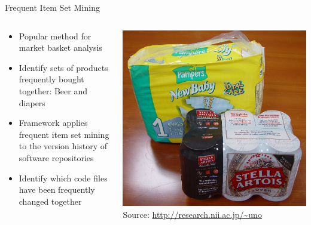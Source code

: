 \begin{frame}{Frequent Item Set Mining}
  \begin{columns}[c]
    \begin{column}{0.5\textwidth}
      \begin{itemize}
      \item Popular method for market basket analysis
      \item Identify sets of products frequently bought together: Beer
        and diapers
      \item Framework applies frequent item set mining to the version
        history of software repositories
      \item Identify which code files have been frequently changed
        together
      \end{itemize}
    \end{column}
    \begin{column}{0.5\textwidth}
      \begin{center}
        \includegraphics[width=\textwidth]{figures/frequent-item-set} \\
        \tiny{Source: \url{http://research.nii.ac.jp/~uno}}
      \end{center}
    \end{column}
  \end{columns}
\end{frame}

